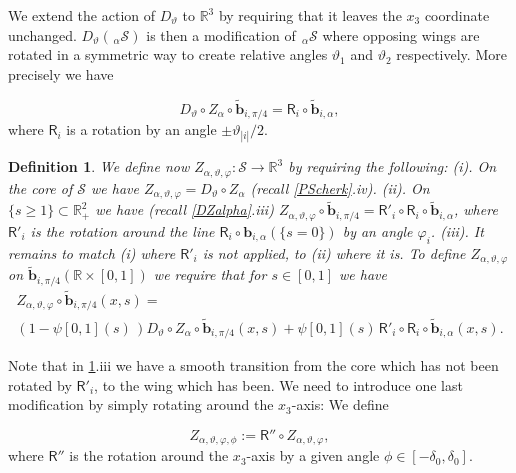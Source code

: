 \documentclass[12pt,namelimits,sumlimits]{amsart}
\newtheorem{definition}[theorem]{Definition}
\theoremstyle{remark}
\numberwithin{equation}{section}
\begin{document}
We extend the action of $D_\vartheta$ to ${{{\mathbb{R}}^3}}$
by requiring that it leaves the $x_3$ coordinate unchanged.
$D_\vartheta({{{}_{\,\alpha\!}\mathcal{S}}})$ is then a modification of ${{{}_{\,\alpha\!}\mathcal{S}}}$ where opposing wings are
rotated in a symmetric way to create relative angles 
$\vartheta_1$ and $\vartheta_2$ respectively.
More precisely we have
\addtocounter{theorem}{1}
\begin{equation}
\label{EDwings}
D_\vartheta\circ Z_\alpha\circ {\widetilde{\boldsymbol{b}}}_{i,\pi/4}={\mathsf{R}}_i\circ{\widetilde{\boldsymbol{b}}}_{{i,\alpha}},
\end{equation}
where ${\mathsf{R}}_i$ is a rotation by an angle $\pm\vartheta_{|i|}/2$.

\addtocounter{equation}{1}
\begin{definition}
\label{DZalthph}
We define now $Z_{{\alpha,\vartheta,\varphi}}:{{\mathcal{S}}}\to{{{\mathbb{R}}^3}}$ by requiring the following:
\newline
(i).
On the core of ${{\mathcal{S}}}$ we have $Z_{{\alpha,\vartheta,\varphi}}=D_\vartheta\circ Z_\alpha$
(recall \ref{PScherk}.iv).
\newline
(ii).
On $\{s\ge1\}\subset{{{\mathbb{R}}^2_+}}$ we have 
(recall \ref{DZalpha}.iii)
$Z_{{\alpha,\vartheta,\varphi}}\circ{\widetilde{\boldsymbol{b}}}_{i,\pi/4}={\mathsf{R}}'_i\circ{\mathsf{R}}_i\circ{\widetilde{\boldsymbol{b}}}_{{i,\alpha}}$,
where ${\mathsf{R}}'_i$ is the rotation around the line ${\mathsf{R}}_i\circ{\boldsymbol{b}}_{{i,\alpha}}(\{s=0\})$
by an angle $\varphi_i$.
\newline
(iii).
It remains to match (i) where ${\mathsf{R}}'_i$ is not applied,
to (ii) where it is.
To define $Z_{{\alpha,\vartheta,\varphi}}$ on ${\widetilde{\boldsymbol{b}}}_{i,\pi/4}({\mathbb{R}}\times[0,1])$
we require that for $s\in[0,1]$ we have
\begin{multline*}
Z_{{\alpha,\vartheta,\varphi}}\circ{\widetilde{\boldsymbol{b}}}_{i,\pi/4}(x,s)=
\\
(1-\psi[0,1](s)\, )
D_\vartheta\circ Z_\alpha\circ{\widetilde{\boldsymbol{b}}}_{i,\pi/4}(x,s)
+
\psi[0,1](s)\,
{\mathsf{R}}'_i\circ{\mathsf{R}}_i\circ{\widetilde{\boldsymbol{b}}}_{{i,\alpha}}(x,s).
\end{multline*}
\end{definition}

Note that in 
\ref{DZalthph}.iii
we have a smooth transition from the core which has not been rotated by ${\mathsf{R}}'_i$,
to the wing which has been.
We need to introduce one last modification by simply rotating around the $x_3$-axis:
We define
\addtocounter{theorem}{1}
\begin{equation}
\label{EZfinal}
Z_{{\alpha,\vartheta,\varphi,\phi}}:={\mathsf{R}}''\circ Z_{{\alpha,\vartheta,\varphi}},
\end{equation}
where ${\mathsf{R}}''$ is the rotation around the $x_3$-axis by a
given angle $\phi\in [-\delta_0,\delta_0]$.
\end{document}
